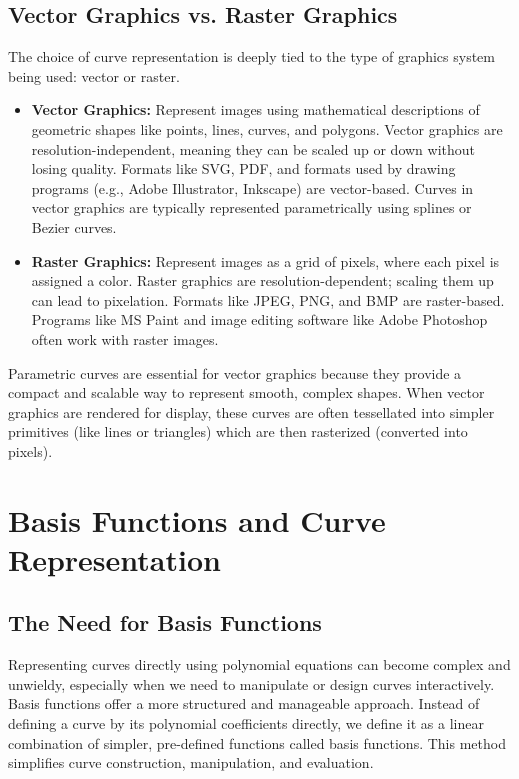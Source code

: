 \documentclass{article}
\begin{document}
\subsection{Vector Graphics vs. Raster Graphics}

The choice of curve representation is deeply tied to the type of graphics system being used: vector or raster.

\begin{itemize}
    \item \textbf{Vector Graphics:} Represent images using mathematical descriptions of geometric shapes like points, lines, curves, and polygons.  Vector graphics are resolution-independent, meaning they can be scaled up or down without losing quality.  Formats like SVG, PDF, and formats used by drawing programs (e.g., Adobe Illustrator, Inkscape) are vector-based. Curves in vector graphics are typically represented parametrically using splines or Bezier curves.

    \item \textbf{Raster Graphics:} Represent images as a grid of pixels, where each pixel is assigned a color. Raster graphics are resolution-dependent; scaling them up can lead to pixelation. Formats like JPEG, PNG, and BMP are raster-based.  Programs like MS Paint and image editing software like Adobe Photoshop often work with raster images.
\end{itemize}

Parametric curves are essential for vector graphics because they provide a compact and scalable way to represent smooth, complex shapes. When vector graphics are rendered for display, these curves are often tessellated into simpler primitives (like lines or triangles) which are then rasterized (converted into pixels).

\section{Basis Functions and Curve Representation}

\subsection{The Need for Basis Functions}

Representing curves directly using polynomial equations can become complex and unwieldy, especially when we need to manipulate or design curves interactively. Basis functions offer a more structured and manageable approach.  Instead of defining a curve by its polynomial coefficients directly, we define it as a linear combination of simpler, pre-defined functions called basis functions. This method simplifies curve construction, manipulation, and evaluation.
\end{document}

